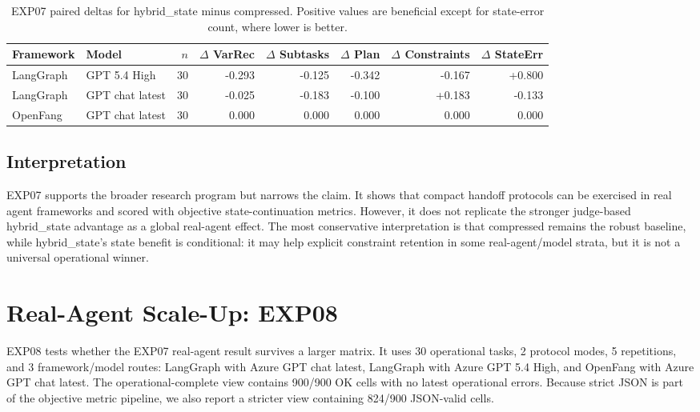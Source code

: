 \documentclass[11pt]{article}
\begin{document}
\begin{table}[ht]
\centering
\small
\begin{tabular}{llrrrrrr}
\toprule
Framework & Model & $n$ & $\Delta$ VarRec & $\Delta$ Subtasks & $\Delta$ Plan & $\Delta$ Constraints & $\Delta$ StateErr \\
\midrule
LangGraph & GPT 5.4 High & 30 & -0.293 & -0.125 & -0.342 & -0.167 & +0.800 \\
LangGraph & GPT chat latest & 30 & -0.025 & -0.183 & -0.100 & +0.183 & -0.133 \\
OpenFang & GPT chat latest & 30 & 0.000 & 0.000 & 0.000 & 0.000 & 0.000 \\
\bottomrule
\end{tabular}
\caption{EXP07 paired deltas for hybrid\_state minus compressed. Positive values are beneficial except for state-error count, where lower is better.}
\label{tab:exp07_paired}
\end{table}

\subsection{Interpretation}
EXP07 supports the broader research program but narrows the claim. It shows that compact handoff protocols can be exercised in real agent frameworks and scored with objective state-continuation metrics. However, it does not replicate the stronger judge-based hybrid\_state advantage as a global real-agent effect. The most conservative interpretation is that compressed remains the robust baseline, while hybrid\_state's state benefit is conditional: it may help explicit constraint retention in some real-agent/model strata, but it is not a universal operational winner.

\section{Real-Agent Scale-Up: EXP08}
EXP08 tests whether the EXP07 real-agent result survives a larger matrix. It uses 30 operational tasks, 2 protocol modes, 5 repetitions, and 3 framework/model routes: LangGraph with Azure GPT chat latest, LangGraph with Azure GPT 5.4 High, and OpenFang with Azure GPT chat latest. The operational-complete view contains 900/900 OK cells with no latest operational errors. Because strict JSON is part of the objective metric pipeline, we also report a stricter view containing 824/900 JSON-valid cells.
\end{document}
